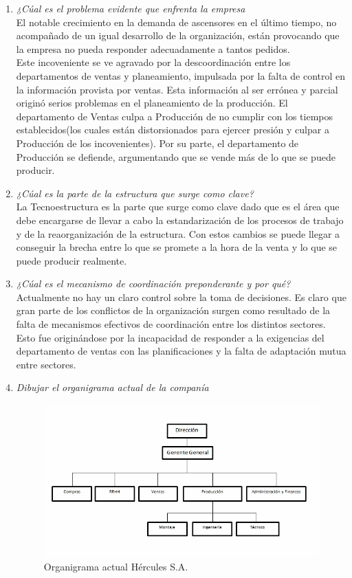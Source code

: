 \documentclass[a4paper,10pt]{article}
\begin{document}
\begin{enumerate}
			\item \textit{¿Cúal es el problema evidente que enfrenta la empresa}\\
El notable crecimiento en la demanda de ascensores en el último tiempo, no acompañado de un igual desarrollo de la organización, están provocando que la empresa no pueda responder adecuadamente a tantos pedidos.\\		
			Este incoveniente se ve agravado por la descoordinación entre los departamentos de ventas y planeamiento, impulsada por la falta de control en la información provista por ventas. Esta información al ser errónea y parcial originó serios problemas en el planeamiento de la producción. 
			El departamento de Ventas culpa a Producción de no cumplir con los tiempos establecidos(los cuales están distorsionados para ejercer presión y culpar a Producción de los incovenientes).
			Por su parte, el departamento de Producción se defiende, argumentando que se vende más de lo que se puede producir.
			
			\item \textit{¿Cúal es la parte de la estructura que surge como clave?}\\
			La Tecnoestructura es la parte que surge como clave dado que es el área que debe encargarse de llevar a cabo la estandarización de los procesos de trabajo y de la reaorganización de la estructura. Con estos cambios se puede llegar a conseguir la brecha entre lo que se promete a la hora de la venta y lo que se puede producir realmente.

			\item \textit{¿Cúal es el mecanismo de coordinación preponderante y por qué?}\\
			Actualmente no hay un claro control sobre la toma de decisiones. Es claro que gran parte de los conflictos de la organización surgen como resultado de la falta de mecanismos efectivos de coordinación entre los distintos sectores.
Esto fue originándose por la incapacidad de responder a la exigencias del departamento de ventas con las planificaciones y la falta de adaptación mutua entre sectores.
						
			\item \textit{Dibujar el organigrama actual de la companía}\\
				\begin{figure}[H]
					\centering
					\includegraphics[scale=0.6]{imagenes/inicialHercules.jpg}
					\caption{Organigrama actual Hércules S.A.}
				\end{figure}
						

\end{enumerate}
\end{document}
